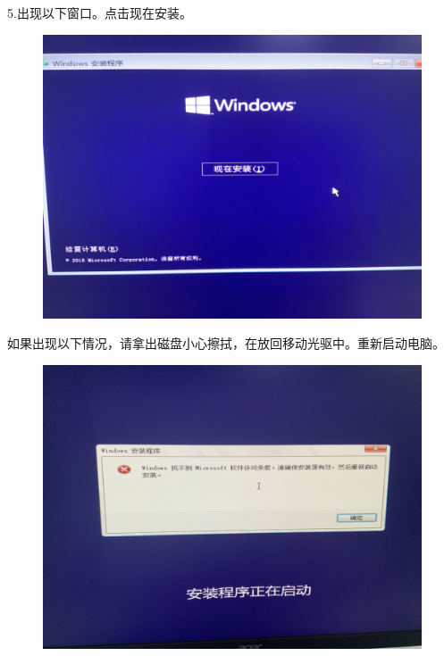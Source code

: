\documentclass[openbib]{article}
\begin{document}
5.出现以下窗口。点击现在安装。
\begin{figure}[H]
	\centering
	\includegraphics[scale=0.05]{5}
\end{figure}

如果出现以下情况，请拿出磁盘小心擦拭，在放回移动光驱中。重新启动电脑。
\begin{figure}[H]
	\centering
	\includegraphics[scale=0.05]{5.1}
\end{figure}
\end{document}
